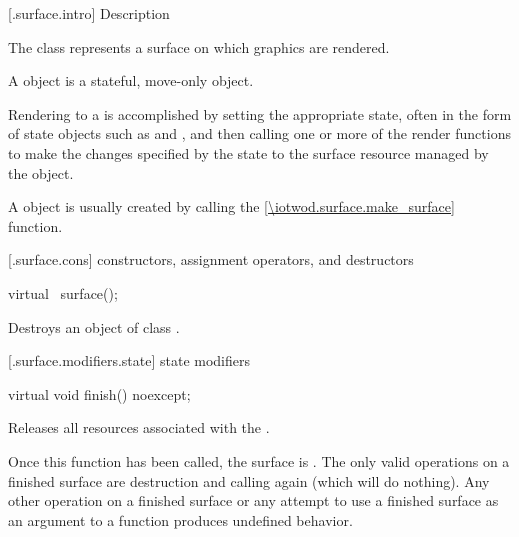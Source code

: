  [\iotwod.surface.intro] { Description}

\pnum
{}
The  class represents a surface on which graphics are rendered.

\pnum
A  object is a stateful, move-only object.

\pnum
Rendering to a  is accomplished by setting the appropriate state, often in the form of state objects such as  and , and then calling one or more of the render functions to make the changes specified by the state to the surface resource managed by the  object.

\pnum
A  object is usually created by calling the  \ref{\iotwod.surface.make_surface} function.

 [\iotwod.surface.cons] { constructors, assignment operators, and destructors}

\begin{itemdecl}
virtual ~surface();
\end{itemdecl}
\begin{itemdescr}
	\pnum
	\effects
	Destroys an object of class .
	
\end{itemdescr}

 [\iotwod.surface.modifiers.state] { state modifiers}

\begin{itemdecl}
virtual void finish() noexcept;
\end{itemdecl}
\begin{itemdescr}
	\pnum
	\effects
	Releases all resources associated with the .
	
	\pnum
	\remarks
	Once this function has been called, the surface is . The only valid operations on a finished surface are destruction and calling  again (which will do nothing). Any other operation on a finished surface or any attempt to use a finished surface as an argument to a function produces undefined behavior.
\end{itemdescr}

